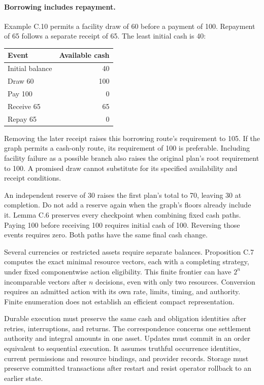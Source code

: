 \documentclass{momentum}
\begin{document}
\paragraph{Borrowing includes repayment.}
Example C.10 permits a facility draw of 60 before a payment of 100. Repayment of 65 follows a separate receipt of 65. The least initial cash is 40:
\begin{center}
\begin{tabular}{lr}
\toprule
Event & Available cash\\
\midrule
Initial balance & 40\\
Draw 60 & 100\\
Pay 100 & 0\\
Receive 65 & 65\\
Repay 65 & 0\\
\bottomrule
\end{tabular}
\end{center}
Removing the later receipt raises this borrowing route's requirement to 105. If the graph permits a cash-only route, its requirement of 100 is preferable. Including facility failure as a possible branch also raises the original plan's root requirement to 100. A promised draw cannot substitute for its specified availability and receipt conditions.

An independent reserve of 30 raises the first plan's total to 70, leaving 30 at completion. Do not add a reserve again when the graph's floors already include it. Lemma C.6 preserves every checkpoint when combining fixed cash paths. Paying 100 before receiving 100 requires initial cash of 100. Reversing those events requires zero. Both paths have the same final cash change.

Several currencies or restricted assets require separate balances. Proposition C.7 computes the exact minimal resource vectors, each with a completing strategy, under fixed componentwise action eligibility. This finite frontier can have $2^n$ incomparable vectors after $n$ decisions, even with only two resources. Conversion requires an admitted action with its own rate, limits, timing, and authority. Finite enumeration does not establish an efficient compact representation.

Durable execution must preserve the same cash and obligation identities after retries, interruptions, and returns. The correspondence concerns one settlement authority and integral amounts in one asset. Updates must commit in an order equivalent to sequential execution. It assumes truthful occurrence identities, current permissions and resource bindings, and provider records. Storage must preserve committed transactions after restart and resist operator rollback to an earlier state.
\end{document}
